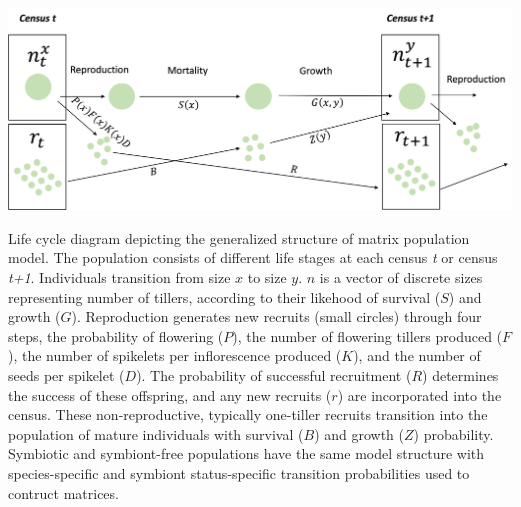 \documentclass[lineno, sn-basic]{sn-jnl}%
\providecommand{\DIFadd}[1]{{\protect\color{blue}#1}} %
\providecommand{\DIFadd}[1]{{\protect\color{blue}\uwave{#1}}} %
\providecommand{\DIFdelbegin}{} %
\providecommand{\DIFaddFL}[1]{\DIFadd{#1}} %
\providecommand{\DIFaddbeginFL}{} %
\providecommand{\DIFaddendFL}{} %
\providecommand{\DIFdelbeginFL}{} %
\providecommand{\DIFdelendFL}{} %
\newcommand{\DIFscaledelfig}{0.5}
\newlength{\DIFdelgraphicswidth} %
\newlength{\DIFdelgraphicsheight} %
\newcommand{\DIFaddincludegraphics}[2][]{{\color{blue}\fbox{\DIFOincludegraphics[#1]{#2}}}} %
\newcommand{\DIFdelincludegraphics}[2][]{%
\sbox{\DIFdelgraphicsbox}{\DIFOincludegraphics[#1]{#2}}%
\settoboxwidth{\DIFdelgraphicswidth}{\DIFdelgraphicsbox} %
\settoboxtotalheight{\DIFdelgraphicsheight}{\DIFdelgraphicsbox} %
\scalebox{\DIFscaledelfig}{%
\parbox[b]{\DIFdelgraphicswidth}{\usebox{\DIFdelgraphicsbox}\\[-\baselineskip] \rule{\DIFdelgraphicswidth}{0em}}\llap{\resizebox{\DIFdelgraphicswidth}{\DIFdelgraphicsheight}{%
\setlength{\unitlength}{\DIFdelgraphicswidth}%
\begin{picture}(1,1)%
\thicklines\linethickness{2pt} %
{\color[rgb]{1,0,0}\put(0,0){\framebox(1,1){}}}%
{\color[rgb]{1,0,0}\put(0,0){\line( 1,1){1}}}%
{\color[rgb]{1,0,0}\put(0,1){\line(1,-1){1}}}%
\end{picture}%
}\hspace*{3pt}}} %
} %
\DeclareRobustCommand{\DIFdelbegin}{\DIFOdelbegin \let\includegraphics\DIFdelincludegraphics} %
\DeclareRobustCommand{\DIFaddbeginFL}{\DIFOaddbeginFL \let\includegraphics\DIFaddincludegraphics} %
\DeclareRobustCommand{\DIFaddendFL}{\DIFOaddendFL \let\includegraphics\DIFOincludegraphics} %
\DeclareRobustCommand{\DIFdelbeginFL}{\DIFOdelbeginFL \let\includegraphics\DIFdelincludegraphics} %
\DeclareRobustCommand{\DIFdelendFL}{\DIFOaddendFL \let\includegraphics\DIFOincludegraphics} %
\begin{document}
\renewcommand\DIFdelbegin %
\DIFdelendFL \DIFaddbeginFL {}   
\setcounter{figure}{0}    

\begin{myfigure}[H]
	\DIFaddendFL \centering
	\DIFdelbeginFL %
\DIFdelendFL \DIFaddbeginFL \includegraphics[width=\linewidth]{life_cycle_diagram.png}
	\caption[Life cycle diagram depicting the generalized structure of matrix population model]{\DIFaddFL{Life cycle diagram depicting the generalized structure of matrix population model. 
		The population consists of different life stages at each census }\emph{\DIFaddFL{t}} \DIFaddFL{or census }\emph{\DIFaddFL{t+1}}\DIFaddFL{. Individuals transition from size $x$ to size $y$. $n$ is a vector of discrete sizes representing number of tillers, according to their likehood of survival ($S$) and growth ($G$).  Reproduction generates new recruits (small circles) through four steps, the probability of flowering ($P$), the number of flowering tillers produced ($F$), the number of spikelets per inflorescence produced ($K$), and the number of seeds per spikelet ($D$). The probability of successful recruitment ($R$) determines the success of these offspring, and any new recruits ($r$) are incorporated into the census. These non-reproductive, typically one-tiller recruits transition into the population of mature individuals with survival ($B$) and growth ($Z$) probability. Symbiotic and symbiont-free populations have the same model structure with species-specific and symbiont status-specific transition probabilities used to contruct matrices.}}
\end{myfigure}
\end{document}
